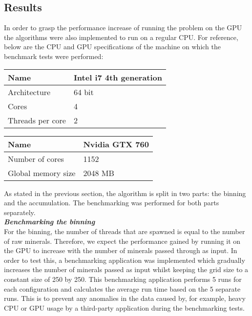 \documentclass[11pt]{IEEEtran}
\begin{document}
\subsection{Results}
In order to grasp the performance increase of running the problem on the GPU the algorithms were also implemented to run on a regular CPU. For reference, below are the CPU and GPU specifications of the machine on which the benchmark tests were performed:\\
  \begin{center}	
    \begin{tabular}{|p{3cm}|p{4cm}|}
	\hline    	
    	Name & Intel i7 4th generation\\
    	\hline
    	Architecture & 64 bit\\
    	\hline
    	Cores & 4\\
    	\hline
    	Threads per core & 2\\
    	\hline
  	\end{tabular}

    \begin{tabular}{|p{3cm}|p{4cm}|}
	\hline    	
    	Name & Nvidia GTX 760\\
    	\hline
    	Number of cores & 1152 \\
    	\hline
    	Global memory size & 2048 MB\\
    	\hline
  	\end{tabular}
  \end{center}	

As stated in the previous section, the algorithm is split in two parts: the binning and the accumulation. The benchmarking was performed for both parts separately.\\

\textbf{\textit{Benchmarking the binning}}\\
For the binning, the number of threads that are spawned is equal to the number of raw minerals. Therefore, we expect the performance gained by running it on the GPU to increase with the number of minerals passed through as input. In order to test this, a benchmarking application was implemented which gradually increases the number of minerals passed as input whilst keeping the grid size to a constant size of 250 by 250. This benchmarking application performs 5 runs for each configuration and calculates the average run time based on the 5 separate runs. This is to prevent any anomalies in the data caused by, for example, heavy CPU or GPU usage by a third-party application during the benchmarking tests.\\
\end{document}

